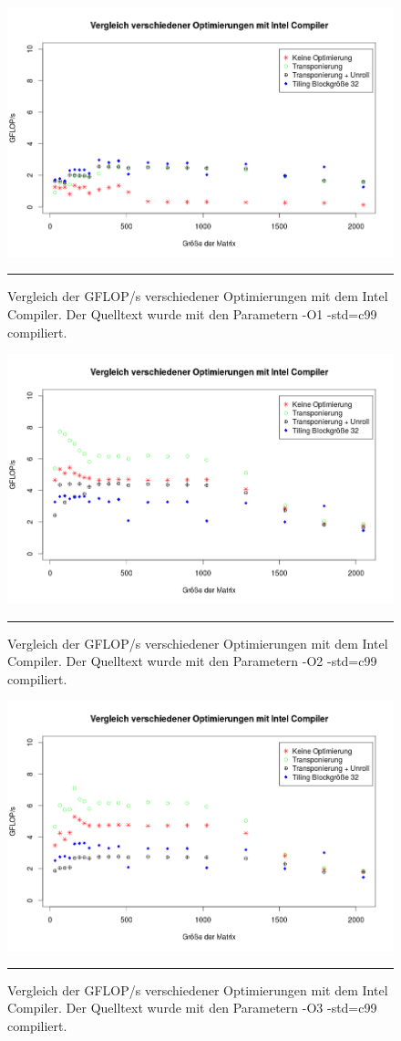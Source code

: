 \begin{figure}[h]
\includegraphics[scale = 0.45]{Bilder/GiccO1.png}
\caption{Vergleich der GFLOP/s verschiedener Optimierungen mit dem Intel Compiler. Der Quelltext wurde mit den Parametern -O1 -std=c99 compiliert.}
\noindent\rule{14cm}{0.4pt}
\label{GiccO1}
\end{figure}

\begin{figure}[h]
\includegraphics[scale = 0.45]{Bilder/GiccO2.png}
\caption{Vergleich der GFLOP/s verschiedener Optimierungen mit dem Intel Compiler. Der Quelltext wurde mit den Parametern -O2 -std=c99 compiliert.}
\noindent\rule{14cm}{0.4pt}
\label{GiccO2}
\end{figure}

\begin{figure}[h]
\includegraphics[scale = 0.45]{Bilder/GiccO3.png}
\caption{Vergleich der GFLOP/s verschiedener Optimierungen mit dem Intel Compiler. Der Quelltext wurde mit den Parametern -O3 -std=c99 compiliert.}
\noindent\rule{14cm}{0.4pt}
\label{GiccO3}
\end{figure}